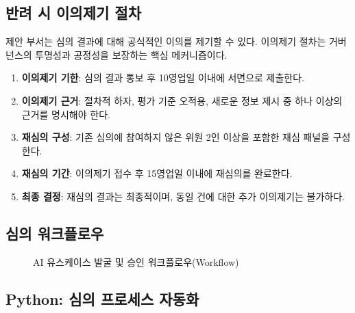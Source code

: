 \subsection{반려 시 이의제기 절차}
\label{sec:8.4.5}

제안 부서는 심의 결과에 대해 공식적인 이의를 제기할 수 있다. 이의제기 절차는 거버넌스의 투명성과 공정성을 보장하는 핵심 메커니즘이다.

\begin{enumerate}
    \item \textbf{이의제기 기한}: 심의 결과 통보 후 10영업일 이내에 서면으로 제출한다.
    \item \textbf{이의제기 근거}: 절차적 하자, 평가 기준 오적용, 새로운 정보 제시 중 하나 이상의 근거를 명시해야 한다.
    \item \textbf{재심의 구성}: 기존 심의에 참여하지 않은 위원 2인 이상을 포함한 재심 패널을 구성한다.
    \item \textbf{재심의 기간}: 이의제기 접수 후 15영업일 이내에 재심의를 완료한다.
    \item \textbf{최종 결정}: 재심의 결과는 최종적이며, 동일 건에 대한 추가 이의제기는 불가하다.
\end{enumerate}

\subsection{심의 워크플로우}
\label{sec:8.4.6}

\begin{figure}[htbp]
\centering
{}
\caption{AI 유스케이스 발굴 및 승인 워크플로우(Workflow)}
\label{fig:usecase_workflow}
\end{figure}

\subsection{Python: 심의 프로세스 자동화}
\label{sec:8.4.7}

